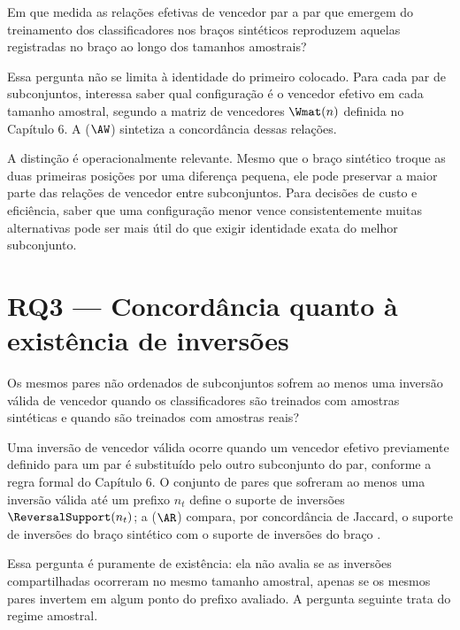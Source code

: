\begin{researchquestionbox}[RQ2]
Em que medida as relações efetivas de vencedor par a par que emergem do treinamento dos classificadores nos braços sintéticos reproduzem aquelas registradas no braço \RealToReal{} ao longo dos tamanhos amostrais?
\end{researchquestionbox}

Essa pergunta não se limita à identidade do primeiro colocado. Para cada par de subconjuntos, interessa saber qual configuração é o vencedor efetivo em cada tamanho amostral, segundo a matriz de vencedores $\Wmat(n)$ definida no Capítulo 6. A \WinnersAgreement{} ($\AW$) sintetiza a concordância dessas relações.

A distinção é operacionalmente relevante. Mesmo que o braço sintético troque as duas primeiras posições por uma diferença pequena, ele pode preservar a maior parte das relações de vencedor entre subconjuntos. Para decisões de custo e eficiência, saber que uma configuração menor vence consistentemente muitas alternativas pode ser mais útil do que exigir identidade exata do melhor subconjunto.

\section{RQ3 --- Concordância quanto à existência de inversões}

\begin{researchquestionbox}[RQ3]
Os mesmos pares não ordenados de subconjuntos sofrem ao menos uma inversão válida de vencedor quando os classificadores são treinados com amostras sintéticas e quando são treinados com amostras reais?
\end{researchquestionbox}

Uma inversão de vencedor válida ocorre quando um vencedor efetivo previamente definido para um par é substituído pelo outro subconjunto do par, conforme a regra formal do Capítulo 6. O conjunto de pares que sofreram ao menos uma inversão válida até um prefixo $n_t$ define o suporte de inversões $\ReversalSupport(n_t)$; a \ReversalExistenceAgreement{} ($\AR$) compara, por concordância de Jaccard, o suporte de inversões do braço sintético com o suporte de inversões do braço \RealToReal{}.

Essa pergunta é puramente de existência: ela não avalia se as inversões compartilhadas ocorreram no mesmo tamanho amostral, apenas se os mesmos pares invertem em algum ponto do prefixo avaliado. A pergunta seguinte trata do regime amostral.

